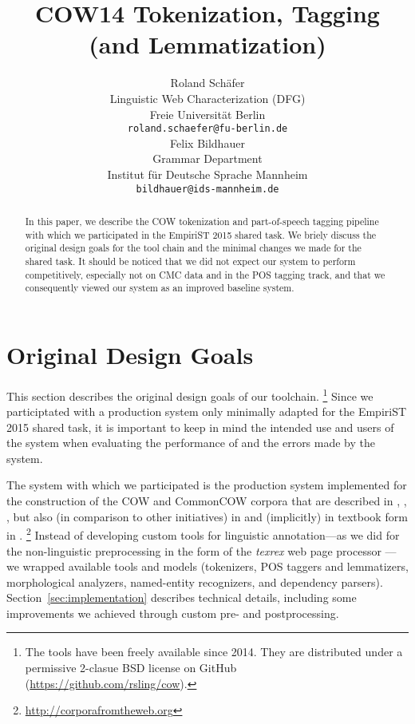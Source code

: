 \documentclass[11pt]{article}
\title{COW14 Tokenization, Tagging (and Lemmatization)}
\author{Roland Schäfer \\
  Linguistic Web Characterization (DFG) \\
  Freie Universität Berlin \\
  {\tt roland.schaefer@fu-berlin.de} \\\And
  Felix Bildhauer \\
  Grammar Department \\
  Institut für Deutsche Sprache Mannheim \\
  {\tt bildhauer@ids-mannheim.de} \\}
\date{}
\begin{document}
\maketitle

\begin{abstract}
  In this paper, we describe the COW tokenization and part-of-speech tagging pipeline with which we participated in the EmpiriST 2015 shared task.
  We briely discuss the original design goals for the tool chain and the minimal changes we made for the shared task.
  It should be noticed that we did not expect our system to perform competitively, especially not on CMC data and in the POS tagging track, and that we consequently viewed our system as an improved baseline system.
\end{abstract}

\section{Original Design Goals}
\label{sec:originaldesigngoals}

This section describes the original design goals of our toolchain.%
\footnote{The tools have been freely available since 2014.
  They are distributed under a permissive 2-clasue BSD license on GitHub (\url{https://github.com/rsling/cow}).}
Since we participtated with a production system only minimally adapted for the EmpiriST 2015 shared task, it is important to keep in mind the intended use and users of the system when evaluating the performance of and the errors made by the system.

The system with which we participated is the production system implemented for the construction of the COW and CommonCOW corpora that are described in , , , but also (in comparison to other initiatives) in  and (implicitly) in textbook form in .%
\footnote{\url{http://corporafromtheweb.org}}
Instead of developing custom tools for linguistic annotation---as we did for the non-linguistic preprocessing in the form of the \textit{texrex} web page processor \cite{SchaeferBildhauer2012a,Schaefer2015b,Schaefer2016c}---we wrapped available tools and models (tokenizers, POS taggers and lemmatizers, morphological analyzers, named-entity recognizers, and dependency parsers).
Section~\ref{sec:implementation} describes technical details, including some improvements we achieved through custom pre- and postprocessing.
\end{document}
